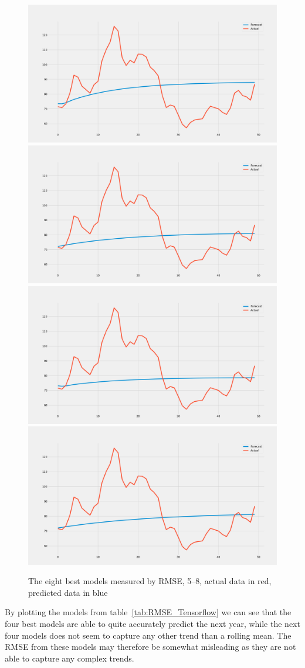 \begin{figure}[H]
    \includegraphics[width=.48\textwidth]{../data/Figures/Neural networks/ForLoop_Tensor/plotmodel_202.png}\hfill
    \includegraphics[width=.48\textwidth]{../data/Figures/Neural networks/ForLoop_Tensor/plotmodel_124.png}\hfill
    \\[\smallskipamount]
    \includegraphics[width=.48\textwidth]{../data/Figures/Neural networks/ForLoop_Tensor/plotmodel_130.png}\hfill
    \includegraphics[width=.48\textwidth]{../data/Figures/Neural networks/ForLoop_Tensor/plotmodel_52.png}
    \captionsetup{justification=centering}
    \caption[The eight best models measured by RMSE, 5--8]{The eight best models measured by RMSE, 5--8, actual data in red, predicted data in blue}\label{fig:best_models58}
\end{figure}

\vspace{\baselineskip}
By plotting the models from table~\ref{tab:RMSE_Tensorflow} we can see that the four best models are able to quite accurately predict the next year, while the next four models does not seem to capture any other trend than a rolling mean. The RMSE from these models may therefore be somewhat misleading as they are not able to capture any complex trends. 

